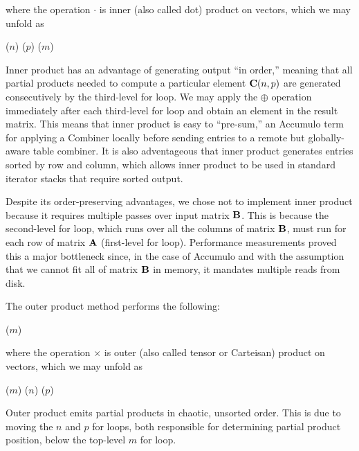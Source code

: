 \noindent where the operation $\cdot$ is inner (also called dot) product on vectors, which we may unfold as
\begin{algorithm}[h]
\fore($n$){
\fore($p$){
\fore($m$){
}}}
\end{algorithm}

Inner product has an advantage of generating output ``in order,'' meaning that all partial products needed 
to compute a particular element $\mathbf{C}(n,p)$ are generated consecutively by the third-level for loop.
We may apply the $\oplus$ operation immediately after each third-level for loop and obtain an element in the result matrix.
This means that inner product is easy to ``pre-sum,'' an Accumulo term for applying a Combiner
locally before sending entries to a remote but globally-aware table combiner.
It is also adventageous that inner product generates entries sorted by row 
and column, which allows inner product to be used in standard iterator stacks that require sorted output.

Despite its order-preserving advantages, we chose not to implement inner product because 
it requires multiple passes over input matrix $\mathbf{B}$. This is because the second-level for loop, 
which runs over all the columns of matrix $\mathbf{B}$, must run for each row of matrix $\mathbf{A}$ (first-level for loop).
Performance measurements proved this a major bottleneck since, in the case of Accumulo
and with the assumption that we cannot fit all of matrix $\mathbf{B}$ in memory, it mandates multiple reads from disk.

The outer product method performs the following:
\begin{algorithm}
\fore($m$){
}
\end{algorithm}

\noindent where the operation $\times$ is outer (also called tensor or Carteisan) product on vectors, which we may unfold as
\begin{algorithm}
\fore($m$){
\fore($n$){
\fore($p$){
}}}
\end{algorithm}

Outer product emits partial products in chaotic, unsorted order.
This is due to moving the $n$ and $p$ for loops, both responsible for determining partial product position,
below the top-level $m$ for loop.

